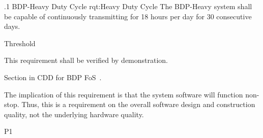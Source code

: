 \ONERQMTVKSA
{\RqtNumberBase.1}
{BDP-Heavy Duty Cycle}
{rqt:Heavy Duty Cycle}
{The BDP-Heavy system shall be capable of continuously transmitting for 18 hours per day for 30 consecutive days.}
{
	\item [Phase 1] Threshold
}
{This requirement shall be verified by demonstration.}
{
\item [5.5.14.1] Section in CDD for BDP FoS~\cite{ref__BDP_FOS_CDD}.
}
{
	\item The implication of this requirement is that the system software will function non-stop. Thus, this is a requirement on the overall software design and construction quality, not the underlying hardware quality.
}
{P1}

